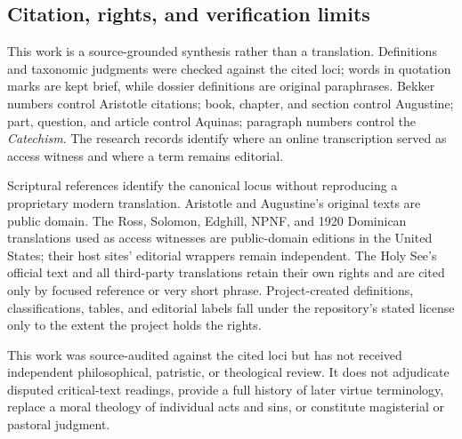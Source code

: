 {\subsection{Citation, rights, and verification limits}

This work is a source-grounded synthesis rather than a translation. Definitions and taxonomic judgments were checked against the cited loci; words in quotation marks are kept brief, while dossier definitions are original paraphrases. Bekker numbers control Aristotle citations; book, chapter, and section control Augustine; part, question, and article control Aquinas; paragraph numbers control the \emph{Catechism}. The research records identify where an online transcription served as access witness and where a term remains editorial.

Scriptural references identify the canonical locus without reproducing a proprietary modern translation. Aristotle and Augustine's original texts are public domain. The Ross, Solomon, Edghill, NPNF, and 1920 Dominican translations used as access witnesses are public-domain editions in the United States; their host sites' editorial wrappers remain independent. The Holy See's official text and all third-party translations retain their own rights and are cited only by focused reference or very short phrase. Project-created definitions, classifications, tables, and editorial labels fall under the repository's stated license only to the extent the project holds the rights.

This work was source-audited against the cited loci but has not received independent philosophical, patristic, or theological review. It does not adjudicate disputed critical-text readings, provide a full history of later virtue terminology, replace a moral theology of individual acts and sins, or constitute magisterial or pastoral judgment.
}
